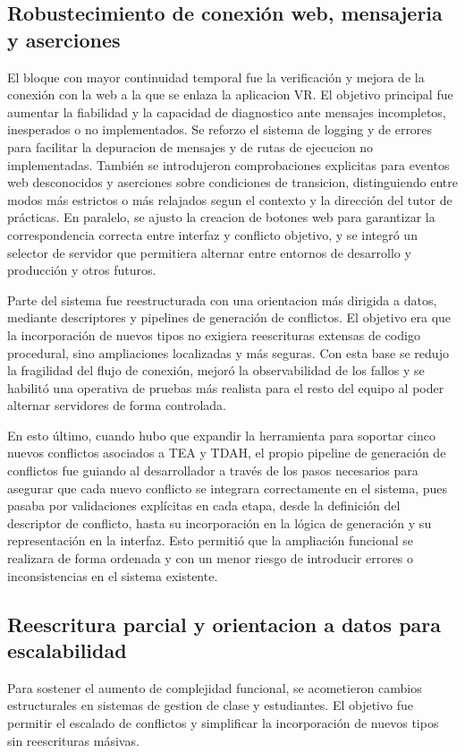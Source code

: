 \subsection{Robustecimiento de conexión web, mensajeria y aserciones}
El bloque con mayor continuidad temporal fue la verificación y mejora de la conexión con la web a la que se enlaza la aplicacion VR. El objetivo principal fue aumentar la fiabilidad y la capacidad de diagnostico ante mensajes incompletos, inesperados o no implementados. Se reforzo el sistema de logging y de errores para facilitar la depuracion de mensajes y de rutas de ejecucion no implementadas. También se introdujeron comprobaciones explicitas para eventos web desconocidos y aserciones sobre condiciones de transicion, distinguiendo entre modos más estrictos o más relajados segun el contexto y la dirección del tutor de prácticas. En paralelo, se ajusto la creacion de botones web para garantizar la correspondencia correcta entre interfaz y conflicto objetivo, y se integró un selector de servidor que permitiera alternar entre entornos de desarrollo y producción y otros futuros.\par

Parte del sistema fue reestructurada con una orientacion más dirigida a datos, mediante descriptores y pipelines de generación de conflictos. El objetivo era que la incorporación de nuevos tipos no exigiera reescrituras extensas de codigo procedural, sino ampliaciones localizadas y más seguras. Con esta base se redujo la fragilidad del flujo de conexión, mejoró la observabilidad de los fallos y se habilitó una operativa de pruebas más realista para el resto del equipo al poder alternar servidores de forma controlada.\par

En esto último, cuando hubo que expandir la herramienta para soportar cinco nuevos conflictos asociados a TEA y TDAH, el propio pipeline de generación de conflictos fue guiando al desarrollador a través de los pasos necesarios para asegurar que cada nuevo conflicto se integrara correctamente en el sistema, pues pasaba por validaciones explícitas en cada etapa, desde la definición del descriptor de conflicto, hasta su incorporación en la lógica de generación y su representación en la interfaz. Esto permitió que la ampliación funcional se realizara de forma ordenada y con un menor riesgo de introducir errores o inconsistencias en el sistema existente.\par

\subsection{Reescritura parcial y orientacion a datos para escalabilidad}
Para sostener el aumento de complejidad funcional, se acometieron cambios estructurales en sistemas de gestion de clase y estudiantes. El objetivo fue permitir el escalado de conflictos y simplificar la incorporación de nuevos tipos sin reescrituras másivas.\par

